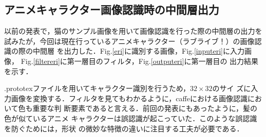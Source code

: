 \documentclass[a4paper,10pt]{jsarticle}
\begin{document}
\subsection{アニメキャラクター画像認識時の中間層出力}
以前の発表で，猫のサンプル画像を用いて画像認識を行った際の中間層の出力を
試みたが，今回は現在行っているアニメキャラクター（ラブライブ！）の画像認識の際の中間層
を出力した．Fig.\ref{eri}に識別する画像，Fig.\ref{inputeri}に入力画像，
Fig.\ref{filtereri}に第一層目のフィルタ，Fig.\ref{outputeri}に第一層目の
出力結果を示す．

.prototexファイルを用いてキャラクター識別を行うため，$32\times 32$のサイ
ズに入力画像を変換する．フィルタを見てもわかるように，caffeにおける画像認識において色も重要な判
断要素であると言える．前回の発表にもあったように，髪の色が似ているアニメ
キャラクターは誤認識が起こっていた．このような誤認識を防ぐためには，形状
の微妙な特徴の違いに注目する工夫が必要である．
\end{document}
